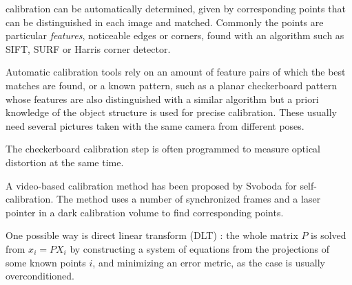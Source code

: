 calibration can be automatically determined, given by corresponding points that can be distinguished in each image and matched. Commonly the points are particular \emph{features}, noticeable edges or corners, found with an algorithm such as SIFT, SURF or Harris corner detector. %




Automatic calibration tools rely on an amount of feature pairs of which the best matches are found, or a known pattern, such as a planar checkerboard pattern \cite{chuang2002performance,zhang2000flexible} whose features are also distinguished with a similar algorithm but a priori knowledge of the object structure is used for precise calibration.
These usually need several pictures taken with the same camera from different poses.

The checkerboard calibration step is often programmed to measure optical distortion at the same time. \cite{opencv,camcalmatlab}

A video-based calibration method has been proposed by Svoboda for self-calibration. The method uses a number of synchronized frames and a laser pointer in a dark calibration volume to find corresponding points. \cite{svoboda2005convenient}


One possible way is direct linear transform (DLT) \cite{hartley03multiview}: the whole matrix $P$ is solved from $x_i = PX_i$ by constructing a system of equations from the projections of some known points $i$, and minimizing an error metric, as the case is usually overconditioned.



